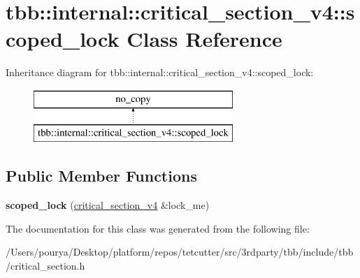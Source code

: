 \hypertarget{classtbb_1_1internal_1_1critical__section__v4_1_1scoped__lock}{}\section{tbb\+:\+:internal\+:\+:critical\+\_\+section\+\_\+v4\+:\+:scoped\+\_\+lock Class Reference}
\label{classtbb_1_1internal_1_1critical__section__v4_1_1scoped__lock}
Inheritance diagram for tbb\+:\+:internal\+:\+:critical\+\_\+section\+\_\+v4\+:\+:scoped\+\_\+lock\+:\begin{figure}[H]
\begin{center}
\leavevmode
\includegraphics[height=2.000000cm]{classtbb_1_1internal_1_1critical__section__v4_1_1scoped__lock}
\end{center}
\end{figure}
\subsection*{Public Member Functions}
\begin{DoxyCompactItemize}
\item 
\hypertarget{classtbb_1_1internal_1_1critical__section__v4_1_1scoped__lock_a3d2a294e9d790bdeba9ca3ff60e75d53}{}{\bfseries scoped\+\_\+lock} (\hyperlink{classtbb_1_1internal_1_1critical__section__v4}{critical\+\_\+section\+\_\+v4} \&lock\+\_\+me)\label{classtbb_1_1internal_1_1critical__section__v4_1_1scoped__lock_a3d2a294e9d790bdeba9ca3ff60e75d53}

\end{DoxyCompactItemize}


The documentation for this class was generated from the following file\+:\begin{DoxyCompactItemize}
\item 
/\+Users/pourya/\+Desktop/platform/repos/tetcutter/src/3rdparty/tbb/include/tbb/critical\+\_\+section.\+h\end{DoxyCompactItemize}
